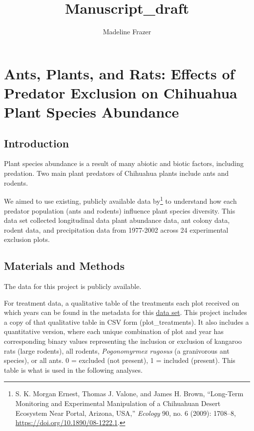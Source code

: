\documentclass[
]{article}
\title{Manuscript\_draft}
\author{Madeline Frazer}
\date{}
\begin{document}
\maketitle

\section{Ants, Plants, and Rats: Effects of Predator Exclusion on
Chihuahua Plant Species
Abundance}\label{ants-plants-and-rats-effects-of-predator-exclusion-on-chihuahua-plant-species-abundance}

\subsection{Introduction}\label{introduction}

Plant species abundance is a result of many abiotic and biotic factors,
including predation. Two main plant predators of Chihuahua plants
include ants and rodents.

We aimed to use existing, publicly available data by\footnote{S. K.
  Morgan Ernest, Thomas J. Valone, and James H. Brown, {``Long-Term
  Monitoring and Experimental Manipulation of a Chihuahuan Desert
  Ecosystem Near Portal, Arizona, USA,''} \emph{Ecology} 90, no. 6
  (2009): 1708--8, \url{https://doi.org/10.1890/08-1222.1}.} to
understand how each predator population (ants and rodents) influence
plant species diversity. This data set collected longitudinal data plant
abundance data, ant colony data, rodent data, and precipitation data
from 1977-2002 across 24 experimental exclusion plots.

\subsection{Materials and Methods}\label{materials-and-methods}

The data for this project is publicly available.

For treatment data, a qualitative table of the treatments each plot
received on which years can be found in the metadata for this
\href{https://www.esapubs.org/archive/ecol/E090/118/metadata.htm}{data
set}. This project includes a copy of that qualitative table in CSV form
(plot\_treatments). It also includes a quantitative version, where each
unique combination of plot and year has corresponding binary values
representing the inclusion or exclusion of kangaroo rats (large
rodents), all rodents, \emph{Pogonomyrmex rugosus} (a granivorous ant
species), or all ants. 0 = excluded (not present), 1 = included
(present). This table is what is used in the following analyses.
\end{document}
